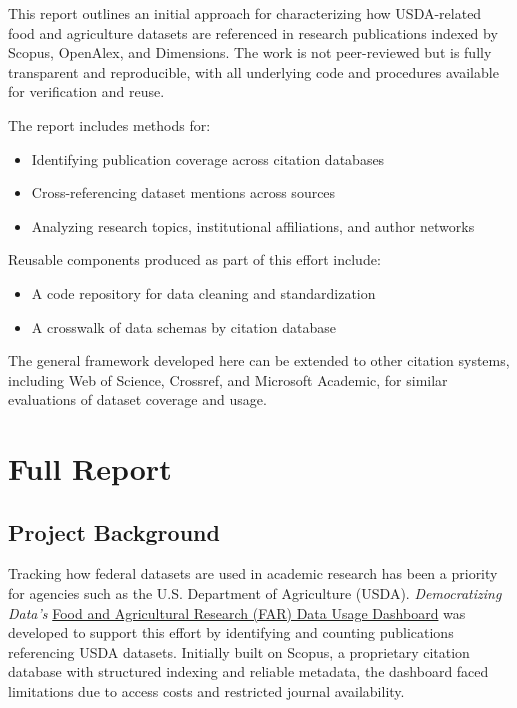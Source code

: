 \documentclass[
  letterpaper,
  DIV=11,
  numbers=noendperiod]{scrartcl}
\providecommand{\tightlist}{%
  \setlength{\itemsep}{0pt}\setlength{\parskip}{0pt}}\usepackage{longtable,booktabs,array}
\begin{document}
This report outlines an initial approach for characterizing how
USDA-related food and agriculture datasets are referenced in research
publications indexed by Scopus, OpenAlex, and Dimensions. The work is
not peer-reviewed but is fully transparent and reproducible, with all
underlying code and procedures available for verification and reuse.

The report includes methods for:

\begin{itemize}
\tightlist
\item
  Identifying publication coverage across citation databases
\item
  Cross-referencing dataset mentions across sources
\item
  Analyzing research topics, institutional affiliations, and author
  networks
\end{itemize}

Reusable components produced as part of this effort include:

\begin{itemize}
\tightlist
\item
  A code repository for data cleaning and standardization
\item
  A crosswalk of data schemas by citation database
\end{itemize}

The general framework developed here can be extended to other citation
systems, including Web of Science, Crossref, and Microsoft Academic, for
similar evaluations of dataset coverage and usage.

\newpage

\section{Full Report}\label{full-report}

\subsection{Project Background}\label{project-background}

Tracking how federal datasets are used in academic research has been a
priority for agencies such as the U.S. Department of Agriculture (USDA).
\emph{Democratizing Data's}
\href{https://democratizingdata.ai/tools/dashboard/food-agricultural-research/}{Food
and Agricultural Research (FAR) Data Usage Dashboard} was developed to
support this effort by identifying and counting publications referencing
USDA datasets. Initially built on Scopus, a proprietary citation
database with structured indexing and reliable metadata, the dashboard
faced limitations due to access costs and restricted journal
availability.
\end{document}
